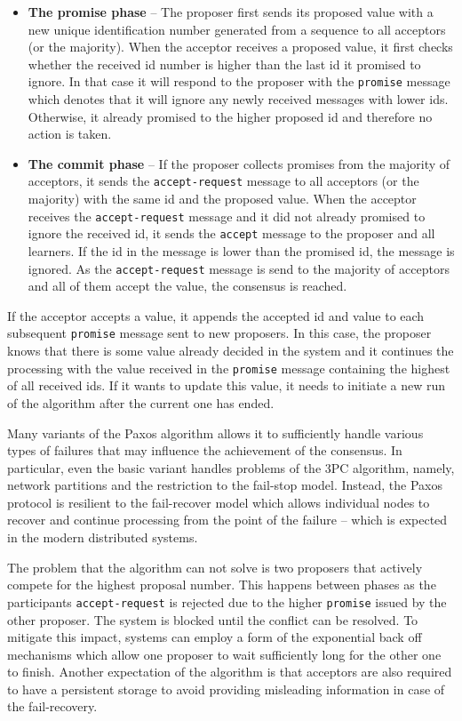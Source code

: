 \documentclass[oneside,
  digital, %
  table,   %
  nolof,     %
  nolot,     %
]{fithesis3}
\begin{document}
\begin{itemize}
    \item \textbf{The promise phase} -- The proposer first sends its proposed value with a new unique identification number generated from a sequence to all acceptors (or the majority). When the acceptor receives a proposed value, it first checks whether the received id number is higher than the last id it promised to ignore. In that case it will respond to the proposer with the \texttt{promise} message which denotes that it will ignore any newly received messages with lower ids. Otherwise, it already promised to the higher proposed id and therefore no action is taken.
    
    \item \textbf{The commit phase} -- If the proposer collects promises from the majority of acceptors, it sends the \texttt{accept-request} message to all acceptors (or the majority) with the same id and the proposed value. When the acceptor receives the \texttt{accept-request} message and it did not already promised to ignore the received id, it sends the \texttt{accept} message to the proposer and all learners. If the id in the message is lower than the promised id, the message is ignored. As the \texttt{accept-request} message is send to the majority of acceptors and all of them accept the value, the consensus is reached.
\end{itemize}

If the acceptor accepts a value, it appends the accepted id and value to each subsequent \texttt{promise} message sent to new proposers. In this case, the proposer knows that there is some value already decided in the system and it continues the processing with the value received in the \texttt{promise} message containing the highest of all received ids. If it wants to update this value, it needs to initiate a new run of the algorithm after the current one has ended. 

Many variants of the Paxos algorithm allows it to sufficiently handle various types of failures that may influence the achievement of the consensus. In particular, even the basic variant handles problems of the 3PC algorithm, namely, network partitions and the restriction to the fail-stop model. Instead, the Paxos protocol is resilient to the fail-recover model which allows individual nodes to recover and continue processing from the point of the failure -- which is expected in the modern distributed systems.

The problem that the algorithm can not solve is two proposers that actively compete for the highest proposal number. This happens between phases as the participants \texttt{accept-request} is rejected due to the higher \texttt{promise} issued by the other proposer. The system is blocked until the conflict can be resolved. To mitigate this impact, systems can employ a form of the exponential back off mechanisms which allow one proposer to wait sufficiently long for the other one to finish. Another expectation of the algorithm is that acceptors are also required to have a persistent storage to avoid providing misleading information in case of the fail-recovery.
\end{document}
